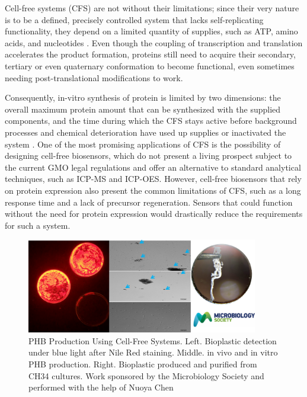Cell-free systems (CFS) are not without their limitations; since their very nature is to be a defined, precisely controlled system that lacks self-replicating functionality, they depend on a limited quantity of supplies, such as ATP, amino acids, and nucleotides \citep{kwon2015high}. Even though the coupling of transcription and translation accelerates the product formation, proteins still need to acquire their secondary, tertiary or even quaternary conformation to become functional, even sometimes needing post-translational modifications to work. 

Consequently, in-vitro synthesis of protein is limited by two dimensions: the overall maximum protein amount that can be synthesized with the supplied components, and the time during which the CFS stays active before background processes and chemical deterioration have used up supplies or inactivated the system \citep{carlson2012cell, bernhard2013cell,kwon2015high}. One of the most promising applications of CFS is the possibility of designing cell-free biosensors, which do not present a living prospect subject to the current GMO legal regulations and offer an alternative to standard analytical techniques, such as ICP-MS and ICP-OES. However, cell-free biosensors that rely on protein expression also present the common limitations of CFS, such as a long response time and a lack of precursor regeneration. Sensors that could function without the need for protein expression would drastically reduce the requirements for such a system.
\begin{figure}[!ht]
  \centering
  \includegraphics[width=0.9\textwidth]{discussion/chapter/figs/bioplastics.png}
  \caption{PHB Production Using Cell-Free Systems. Left. Bioplastic detection under blue light after Nile Red staining. Middle. in vivo and in vitro PHB production. Right. Bioplastic produced and purified from CH34 cultures. Work sponsored by the Microbiology Society and performed with the help of Nuoya Chen}
  \label{fig.discu2}
\end{figure}


